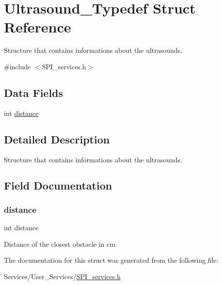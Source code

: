 \hypertarget{struct_ultrasound___typedef}{}\section{Ultrasound\+\_\+\+Typedef Struct Reference}
\label{struct_ultrasound___typedef}


Structure that contains informations about the ultrasounds.  




{\ttfamily \#include $<$S\+P\+I\+\_\+services.\+h$>$}

\subsection*{Data Fields}
\begin{DoxyCompactItemize}
\item 
int \hyperlink{struct_ultrasound___typedef_afb9412686cd344ad61757c1c19ba8a87}{distance}
\end{DoxyCompactItemize}


\subsection{Detailed Description}
Structure that contains informations about the ultrasounds. 

\subsection{Field Documentation}
\mbox{\label{struct_ultrasound___typedef_afb9412686cd344ad61757c1c19ba8a87}} 
\subsubsection{\texorpdfstring{distance}{distance}}
{\footnotesize\ttfamily int distance}

Distance of the closest obstacle in cm 

The documentation for this struct was generated from the following file\+:\begin{DoxyCompactItemize}
\item 
Services/\+User\+\_\+\+Services/\hyperlink{_s_p_i__services_8h}{S\+P\+I\+\_\+services.\+h}\end{DoxyCompactItemize}
